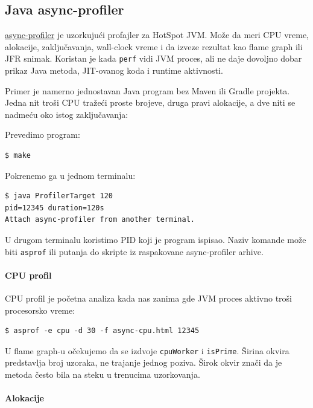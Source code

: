 \subsection{Java async-profiler}\label{java-async-profiler}

\href{https://github.com/async-profiler/async-profiler}{async-profiler} je uzorkujući profajler za HotSpot JVM. Može da meri CPU vreme, alokacije, zaključavanja, wall-clock vreme i da izveze rezultat kao flame graph ili JFR snimak. Koristan je kada \texttt{perf} vidi JVM proces, ali ne daje dovoljno dobar prikaz Java metoda, JIT-ovanog koda i runtime aktivnosti.

Primer je namerno jednostavan Java program bez Maven ili Gradle projekta. Jedna nit troši CPU tražeći proste brojeve, druga pravi alokacije, a dve niti se nadmeću oko istog zaključavanja:


Prevedimo program:

\begin{verbatim}
$ make
\end{verbatim}

Pokrenemo ga u jednom terminalu:

\begin{verbatim}
$ java ProfilerTarget 120
pid=12345 duration=120s
Attach async-profiler from another terminal.
\end{verbatim}

U drugom terminalu koristimo PID koji je program ispisao. Naziv komande može biti \texttt{asprof} ili putanja do skripte iz raspakovane async-profiler arhive.

\paragraph{CPU profil}\label{async-profiler-cpu}

CPU profil je početna analiza kada nas zanima gde JVM proces aktivno troši procesorsko vreme:

\begin{verbatim}
$ asprof -e cpu -d 30 -f async-cpu.html 12345
\end{verbatim}

U flame graph-u očekujemo da se izdvoje \texttt{cpuWorker} i \texttt{isPrime}. Širina okvira predstavlja broj uzoraka, ne trajanje jednog poziva. Širok okvir znači da je metoda često bila na steku u trenucima uzorkovanja.

\paragraph{Alokacije}\label{async-profiler-alloc}


